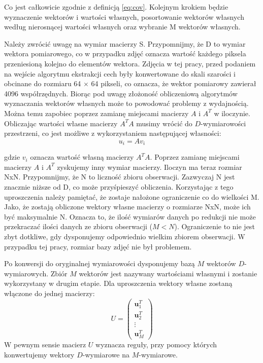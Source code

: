 \documentclass[oneside, eng]{mgr}
\newcommand{\bb}{\textbf}
\begin{document}
Co jest całkowicie zgodnie z definicją \ref{eq:cov}. Kolejnym krokiem będzie wyznaczenie wektorów i wartości własnych, posortowanie wektorów własnych według nierosnącej wartości własnych oraz wybranie M wektorów własnych. 

Należy zwrócić uwagę na wymiar macierzy S. Przypomnijmy, że D to wymiar wektora pomiarowego, co w przypadku zdjęć oznacza wartość każdego piksela przeniesioną kolejno do elementów wektora. Zdjęcia w tej pracy, przed podaniem na wejście algorytmu ekstrakcji cech były konwertowane do skali szarości i obcinane do rozmiaru 64 $\times$ 64 pikseli, co oznacza, że wektor pomiarowy zawierał 4096 współrzędnych. Biorąc pod uwagę złożoność obliczeniową algorytmów wyznaczania wektorów własnych może to powodować problemy z wydajnością. Można temu zapobiec poprzez zamianę miejscami macierzy $A$ i $A^T$ w iloczynie. Obliczając wartości własne macierzy $A^T A$ musimy wrócić do $D$-wymiarowości przestrzeni, co jest możliwe z wykorzystaniem następującej własności:
\begin{equation}
	u_i = A v_i
\end{equation}

gdzie $v_i$ oznacza wartość własną macierzy $A^T A$. Poprzez zamianę miejscami macierzy $A$ i $A^T$ zyskujemy inny wymiar macierzy. Iloczyn ma teraz rozmiar NxN. Przypomnijmy, że N to liczność zbioru obserwacji. Zazwyczaj N jest znacznie niższe od D, co może przyśpieszyć obliczenia. Korzystając z tego uproszczenia należy pamiętać, że zostaje nałożone ograniczenie co do wielkości M. Jako, że zostają obliczone wektory własne macierzy o rozmiarze NxN, może ich być maksymalnie N. Oznacza to, że ilość wymiarów danych po redukcji nie może przekraczać ilości danych ze zbioru obserwacji ($M < N$). Ograniczenie to nie jest zbyt dotkliwe, gdy dysponujemy odpowiednio wielkim zbiorem obserwacji. W przypadku tej pracy, rozmiar bazy zdjęć nie był problemem.

Po konwersji do oryginalnej wymiarowości dysponujemy bazą $M$ wektorów $D$-wymiarowych. Zbiór $M$ wektorów jest nazywany wartościami własnymi i zostanie wykorzystany w drugim etapie. Dla uproszczenia wektory własne zostaną włączone do jednej macierzy:
\begin{equation}
	U = 
	\left( \begin{array}{l}
		\bb{u}_1^T \\
		\bb{u}_2^T \\
		\vdots	 \\
		\bb{u}_M^T
	\end{array} \right)
\end{equation}
W pewnym sensie macierz $U$ wyznacza reguły, przy pomocy których konwertujemy wektory $D$-wymiarowe na $M$-wymiarowe.
\end{document}

